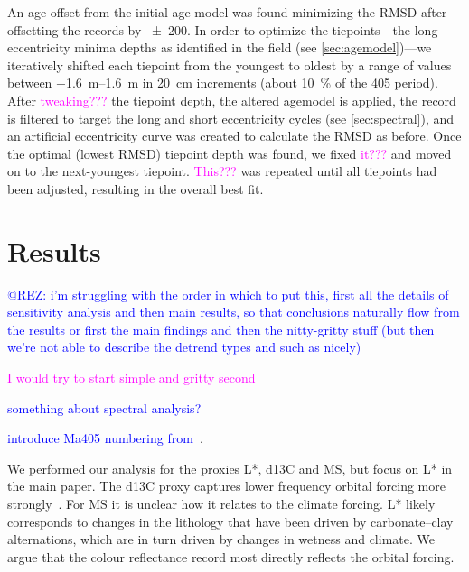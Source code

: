 \documentclass[draft]{agujournal2019}
\newcommand{\rez}{\textcolor{magenta}}
\newcommand{\ijk}{\textcolor{blue}}
\begin{document}
An age offset from the initial age model was found minimizing the \gls{RMSD} after offsetting the records by \qty{\pm200}{\kiloyear}.
In order to optimize the tiepoints---the long eccentricity minima depths as identified in the field (see \cref{sec:agemodel})---we iteratively shifted each tiepoint from the youngest to oldest by a range of values between \qtyrange[range-phrase=~to~]{-1.6}{1.6}{\metre} in \qty{20}{\centi\metre} increments (about \qty{10}{\percent} of the \qty{405}{\kiloyear} period).
After \rez{tweaking???} the tiepoint depth, the altered agemodel is applied, the record is filtered to target the long and short eccentricity cycles (see \cref{sec:spectral}), and an artificial eccentricity curve was created to calculate the \gls{RMSD} as before.
Once the optimal (lowest \gls{RMSD}) tiepoint depth was found, we fixed \rez{it???} and moved on to the next-youngest tiepoint.
\rez{This???} was repeated until all tiepoints had been adjusted, resulting in the overall best fit.

\section{Results}\label{sec:results}

\ijk{@REZ: i'm struggling with the order in which to put this, first all the details of sensitivity analysis and then main results, so that conclusions naturally flow from the results or first the main findings and then the nitty-gritty stuff (but then we're not able to describe the detrend types and such as nicely)}

\rez{I would try to start simple and gritty second}

\ijk{something about spectral analysis?}

\ijk{introduce Ma405 numbering from~\cite{Husson2014}}.

We performed our analysis for the proxies \gls{L*}, \gls{d13C} and \gls{MS}, but  focus on \gls{L*} in the main paper.
The \gls{d13C} proxy captures lower frequency orbital forcing more strongly~\cite{Zeebe2017,Kocken2019loscar}.
For \gls{MS} it is unclear how it relates to the climate forcing. %
\gls{L*} likely corresponds to changes in the lithology that have been driven by carbonate--clay alternations, which are in turn driven by changes in wetness and climate.
We argue that the colour reflectance record most directly reflects the orbital forcing.
\end{document}
